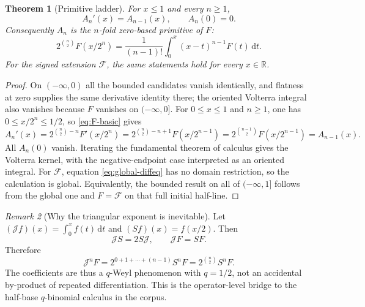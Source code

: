 \documentclass[11pt,oneside]{article}
\numberwithin{equation}{section}
\newtheorem{theorem}{Theorem}[section]
\theoremstyle{definition}
\theoremstyle{remark}
\newtheorem{remark}[theorem]{Remark}
\newcommand{\R}{\mathbb R}
\newcommand{\Vol}{\mathcal J}
\newcommand{\dd}{\,\mathrm d}
\begin{document}
\begin{theorem}[Primitive ladder]
\label{thm:primitive-ladder}
For $x\le1$ and every $n\ge1$,
\begin{equation}
 A_n'(x)=A_{n-1}(x),\qquad A_n(0)=0.                       \label{eq:ladder-derivative}
\end{equation}
Consequently $A_n$ is the $n$-fold zero-based primitive of $F$:
\begin{equation}
 \boxed{
 2^{\binom n2}F(x/2^n)
 =\frac1{(n-1)!}\int_0^x(x-t)^{n-1}F(t)\dd t.}            \label{eq:volterra-ladder}
\end{equation}
For the signed extension $\mathcal F$, the same statements hold for every
$x\in\R$.
\end{theorem}

\begin{proof}
On $(-\infty,0)$ all the bounded candidates vanish identically, and flatness
at zero supplies the same derivative identity there; the oriented Volterra
integral also vanishes because $F$ vanishes on $(-\infty,0]$.  For
$0\le x\le1$ and $n\ge1$, one has $0\le x/2^n\le1/2$, so
\eqref{eq:F-basic} gives
\[
 A_n'(x)=2^{\binom n2-n}F'(x/2^n)
 =2^{\binom n2-n+1}F(x/2^{n-1})
 =2^{\binom{n-1}{2}}F(x/2^{n-1})=A_{n-1}(x).
\]
All $A_n(0)$ vanish.  Iterating the fundamental theorem of calculus gives the
Volterra kernel, with the negative-endpoint case interpreted as an oriented
integral.  For $\mathcal F$, equation \eqref{eq:global-diffeq} has no domain
restriction, so the calculation is global.  Equivalently, the bounded result
on all of $(-\infty,1]$ follows from the global one and
$F=\mathcal F$ on that full initial half-line.
\end{proof}

\begin{remark}[Why the triangular exponent is inevitable]
Let $(\Vol f)(x)=\int_0^xf(t)\dd t$ and $(Sf)(x)=f(x/2)$.  Then
\begin{equation}
 \Vol S=2S\Vol,\qquad \Vol F=SF.                           \label{eq:q-weyl}
\end{equation}
Therefore
\begin{equation}
 \Vol^nF=2^{0+1+\cdots+(n-1)}S^nF
 =2^{\binom n2}S^nF.                                      \label{eq:q-weyl-ladder}
\end{equation}
The coefficients are thus a $q$-Weyl phenomenon with $q=1/2$, not an accidental
by-product of repeated differentiation.  This is the operator-level bridge to
the half-base $q$-binomial calculus in the corpus.
\end{remark}
\end{document}
